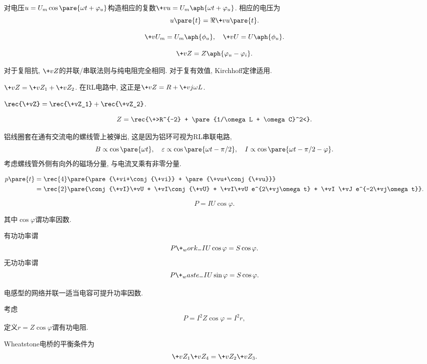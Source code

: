 \documentclass[hidelinks]{ctexart}
\begin{document}
对电压$u=U_m\cos\pare{\omega t+\varphi_u}$构造相应的复数$\+vu = U_m\aph{\omega t + \varphi_u}$. 相应的电压为
\[ u\pare{t} = \Re \+vu\pare{t}. \]
\begin{definition}
    \[ \+vU_m = U_m\aph{\phi_u},\quad \+vU = U\aph{\phi_u}. \]
\end{definition}
\begin{definition}[复阻抗]
    \[ \+vZ = Z\aph{\varphi_u - \varphi_i}. \]
\end{definition}
\begin{finale}
    对于复阻抗, $\+vZ$的并联/串联法则与纯电阻完全相同. 对于复有效值, Kirchhoff定律适用.
\end{finale}
\begin{ex}
    [串联电路]
    $\+vZ = \+vZ_1 + \+vZ_2$. 在RL电路中, 这正是$\+vZ = R+\+vj \omega L$.
\end{ex}
\begin{ex}
    [并联电路]
    $\rec{\+vZ} = \rec{\+vZ_1} + \rec{\+vZ_2}$.
\end{ex}
\begin{ex}[RLC谐振]
    \[ Z = \rec{\+>R^{-2} + \pare{1/\omega L + \omega C}^2<}. \]
\end{ex}
\begin{ex}
    铝线圈套在通有交流电的螺线管上被弹出, 这是因为铝环可视为RL串联电路, 
    \[ B \propto \cos \pare{\omega t},\quad \varepsilon \propto \cos\pare{\omega t - \pi/2},\quad I \propto \cos \pare{\omega t - \pi/2 - \varphi}. \]
    考虑螺线管外侧有向外的磁场分量, 与电流叉乘有非零分量.
\end{ex}
\begin{proposition}
    [瞬时功率]
    \begin{align*}
        p\pare{t} &= \rec{4} \pare{\pare{\+vi+\conj{\+vi}} + \pare{\+vu+\conj{\+vu}}}\\
        &= \rec{2}\pare{\conj{\+vI}\+vU + \+vI\conj{\+vU} + \+vI\+vU e^{2\+vj\omega t} + \+vI \+vJ e^{-2\+vj\omega t}}.
    \end{align*}
\end{proposition}
\begin{finale}
    \begin{corollary}
        [平均功率]
        \[ P = IU\cos\varphi. \]
    \end{corollary}
    其中$\cos \varphi$谓功率因数.
\end{finale}
有功功率谓
\[ P\+_work_ = IU\cos\varphi = S\cos\varphi. \]
无功功率谓
\[ P\+_waste_ = IU\sin\varphi = S\cos\varphi. \]
\begin{ex}
    电感型的网络并联一适当电容可提升功率因数.
\end{ex}
\begin{proposition}
    [有功电阻]
    考虑
    \[ P = I^2Z\cos\varphi = I^2 r, \]
    定义$r = Z\cos\varphi$谓有功电阻.
\end{proposition}
\begin{figure}[ht]
    \centering
\end{figure}
\begin{ex}
    Wheatstone电桥的平衡条件为
    \[ \+vZ_1\+vZ_4=\+vZ_2\+vZ_3. \]
\end{ex}
\end{document}
